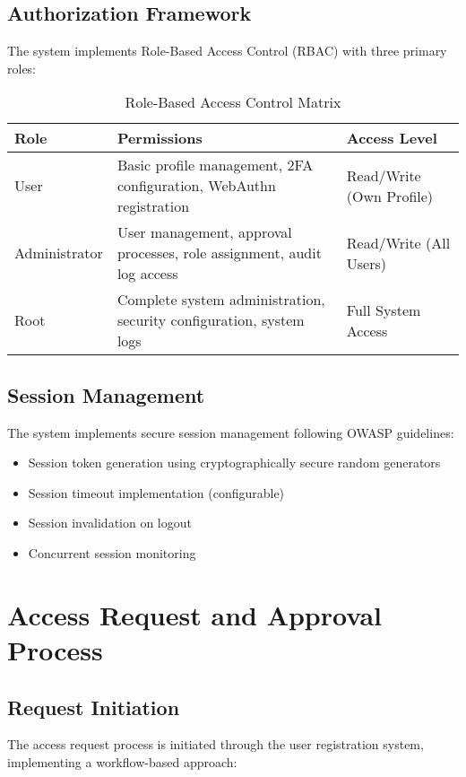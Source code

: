 \documentclass[12pt,a4paper]{article}
\begin{document}
\subsection{Authorization Framework}
The system implements Role-Based Access Control (RBAC) with three primary roles:

\begin{table}[H]
\centering
\begin{tabular}{|l|p{8cm}|l|}
\hline
\textbf{Role} & \textbf{Permissions} & \textbf{Access Level} \\
\hline
User & Basic profile management, 2FA configuration, WebAuthn registration & Read/Write (Own Profile) \\
\hline
Administrator & User management, approval processes, role assignment, audit log access & Read/Write (All Users) \\
\hline
Root & Complete system administration, security configuration, system logs & Full System Access \\
\hline
\end{tabular}
\caption{Role-Based Access Control Matrix}
\label{tab:rbac}
\end{table}

\subsection{Session Management}
The system implements secure session management following OWASP guidelines:

\begin{itemize}
    \item Session token generation using cryptographically secure random generators
    \item Session timeout implementation (configurable)
    \item Session invalidation on logout
    \item Concurrent session monitoring
\end{itemize}

\section{Access Request and Approval Process}

\subsection{Request Initiation}
The access request process is initiated through the user registration system, implementing a workflow-based approach:
\end{document}
